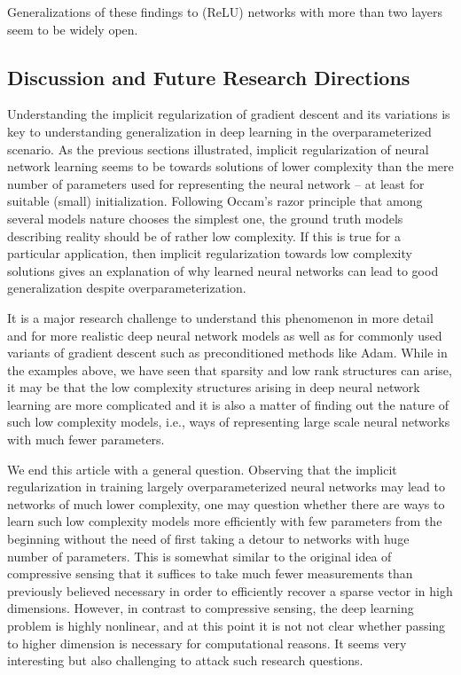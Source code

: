 \documentclass{svproc}
\newcommand{\0}{\boldsymbol{0}}
\newcommand{\1}{\boldsymbol{1}}
\begin{document}
Generalizations of these findings to (ReLU) networks with more than two layers seem to be widely open.



\subsection{Discussion and Future Research Directions}

Understanding the implicit regularization of gradient descent and its variations is key to understanding generalization in deep learning in the overparameterized scenario. As the previous sections illustrated, implicit regularization of neural network learning seems to be towards solutions of lower complexity than the mere number of parameters used for representing the neural network -- at least for suitable (small) initialization.
Following Occam's razor principle that among several models nature chooses the simplest one, the ground truth models describing reality should be of rather low complexity. If this is true for a particular application, then implicit regularization towards low complexity solutions gives an explanation of why learned neural networks can lead to good generalization despite overparameterization.

It is a major research challenge to understand this phenomenon in more detail and for more realistic deep neural network models as well as for commonly used variants of gradient descent such as preconditioned methods like Adam. While in the examples above, we have seen that sparsity and low rank structures can arise, it may be that the low complexity structures arising in deep neural network learning are more complicated and it is also a matter of finding out the nature of such low complexity models, i.e., ways of representing large scale neural networks with much fewer parameters.

We end this article with a general question. Observing that the implicit regularization in training largely overparameterized neural networks may lead to networks of much lower complexity, one may question whether there are ways to learn such low complexity models more efficiently with few parameters from the beginning without the need of first taking a detour to networks with huge number of parameters. This is somewhat similar to the original idea of compressive sensing that it suffices to take much fewer measurements than previously believed necessary in order to efficiently recover a sparse vector in high dimensions. However, in contrast to compressive sensing, the deep learning problem is highly nonlinear, and at this point it is not  
not clear whether passing to higher dimension is necessary for computational reasons.
It seems very interesting but also challenging to attack such research questions.
\end{document}
